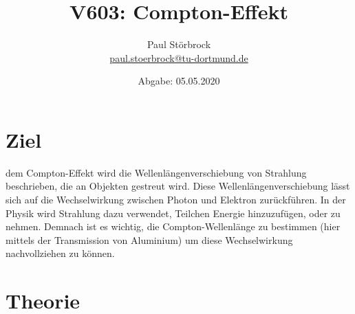 
\usepackage{tikz}

\newcommand*\circled[1]{\tikz[baseline=(char.base)]{
            \node[shape=circle,draw,inner sep=2pt] (char) {#1};}}


    \title{V603: Compton-Effekt}
    \author{  
    Paul Störbrock\\
    \texorpdfstring{\href{mailto:paul.stoerbrock@tu-dortmund.de}{paul.stoerbrock@tu-dortmund.de}}{}
    }
    \date{Abgabe: 05.05.2020\vspace{-4ex}}
\maketitle
    
\newpage
\tableofcontents
\newpage

\setcounter{page}{1}

\section{Ziel}

    \justifying dem Compton-Effekt wird die Wellenlängenverschiebung von Strahlung beschrieben, die an Objekten gestreut wird. Diese Wellenlängenverschiebung
    lässt sich auf die Wechselwirkung zwischen Photon und Elektron zurückführen. In der Physik wird Strahlung dazu verwendet, Teilchen Energie hinzuzufügen, oder 
    zu nehmen. Demnach ist es wichtig, die Compton-Wellenlänge zu bestimmen (hier mittels der Transmission von Aluminium) um diese Wechselwirkung nachvollziehen zu können.

\section{Theorie}

